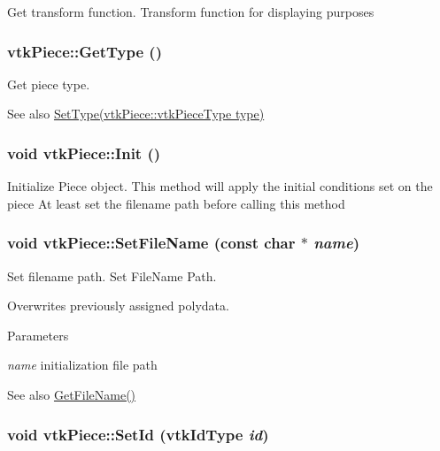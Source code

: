 Get transform function. Transform function for displaying purposes \hypertarget{classvtkPiece_a337c7aa8f4c6a65cee2f436eedc29038}{
\subsubsection[{GetType}]{ vtkPiece::GetType ()}}
\label{classvtkPiece_a337c7aa8f4c6a65cee2f436eedc29038}


Get piece type. \begin{DoxySeeAlso}{See also}
\hyperlink{classvtkPiece_a19bed21306aacd30f7890ff6d364d025}{SetType(vtkPiece::vtkPieceType type)} 
\end{DoxySeeAlso}
\hypertarget{classvtkPiece_abe0c1a250c1bcae71f5513153d1bb395}{
\subsubsection[{Init}]{\setlength{\rightskip}{0pt plus 5cm}void vtkPiece::Init ()}}
\label{classvtkPiece_abe0c1a250c1bcae71f5513153d1bb395}


Initialize Piece object. This method will apply the initial conditions set on the piece At least set the filename path before calling this method \hypertarget{classvtkPiece_a6bd1ffdbd75747966f41c7dfee8f8b4d}{
\subsubsection[{SetFileName}]{\setlength{\rightskip}{0pt plus 5cm}void vtkPiece::SetFileName (const char $\ast$ {\em name})}}
\label{classvtkPiece_a6bd1ffdbd75747966f41c7dfee8f8b4d}


Set filename path. Set FileName Path.

Overwrites previously assigned polydata. 
\begin{DoxyParams}{Parameters}
\item[{\em name}]initialization file path \end{DoxyParams}
\begin{DoxySeeAlso}{See also}
\hyperlink{classvtkPiece_a1a91d9507576694b80da93c1ce7c3861}{GetFileName()} 
\end{DoxySeeAlso}
\hypertarget{classvtkPiece_a077a58755fe796f485c25e3ecda1e994}{
\subsubsection[{SetId}]{\setlength{\rightskip}{0pt plus 5cm}void vtkPiece::SetId (vtkIdType {\em id})}}
\label{classvtkPiece_a077a58755fe796f485c25e3ecda1e994}


